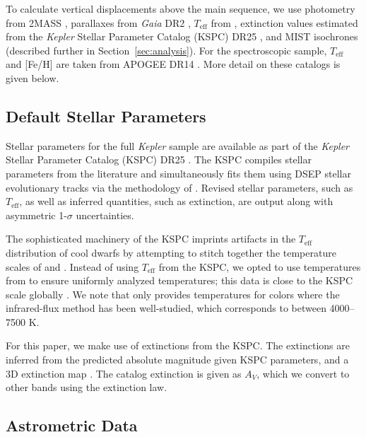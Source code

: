 \documentclass[twocolumn]{aastex6}
\newcommand{\Kepler}{\mbox{\textit{Kepler}}}
\newcommand{\Gaia}{\mbox{\textit{Gaia}}}
\newcommand{\Teff}{\ensuremath{T_{\textrm{eff}}}}
\newcommand{\feh}{\textrm{[Fe/H]}}
\begin{document}
To calculate vertical displacements above the main sequence, we use photometry
from 2MASS \citep{Skrutskie06}, parallaxes from \Gaia{} DR2 \citep{Gaia18},
\Teff{} from \citet{Pinsonneault12}, extinction values estimated from the 
\Kepler{} Stellar Parameter Catalog (KSPC) DR25 \citep{Huber14,Mathur17}, and
MIST isochrones \citep{Choi16} (described further in
Section~\ref{sec:analysis}). For the spectroscopic sample, \Teff{} and
\feh{} are taken from APOGEE DR14 \citep{Abolfathi18}. More detail on these 
catalogs is given below.

\subsection{Default Stellar Parameters}

Stellar parameters for the full \Kepler{} sample are available as part of the
\Kepler{} Stellar Parameter Catalog (KSPC) DR25 \citep{Mathur17}. The KSPC
compiles stellar parameters from the literature and simultaneously fits them
using DSEP stellar evolutionary tracks \citep{Dotter08} via the methodology of
\citet{Huber14}. Revised stellar parameters, such as \Teff, as well as 
inferred quantities, such as extinction, are output along with asymmetric
1-\(\sigma\) uncertainties. 

The sophisticated machinery of the KSPC imprints artifacts in the \Teff{}
distribution of cool dwarfs by attempting to stitch together the temperature
scales of \citet{Pinsonneault12} and \citet{Dressing13}. Instead of using
\Teff{} from the KSPC, we opted to use temperatures from 
\citet{Pinsonneault12} to ensure uniformly analyzed temperatures; this data is
close to the KSPC scale globally \citep{Huber17}. We note that 
\citet{Pinsonneault12} only provides temperatures for colors where the
infrared-flux method has been well-studied, which corresponds to between
4000--7500 K.

For this paper, we make use of extinctions from the KSPC\@. The
extinctions are inferred from the predicted absolute magnitude given KSPC 
parameters, and a 3D extinction map \citep{Amores05}. The catalog extinction 
is given as \(A_V\), which we convert to other bands using the 
\citet{Cardelli89} extinction law. 

\subsection{Astrometric Data}
\end{document}

